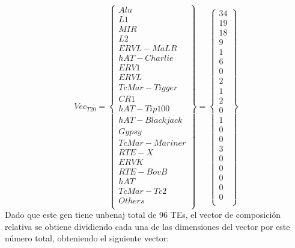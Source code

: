 \documentclass[12pt]{article}
\begin{document}
\begin{equation*}
    Vec_{T20} =
    \begin{Bmatrix}
        Alu\\
        L1\\
        MIR\\
        L2\\
        ERVL-MaLR\\
        hAT-Charlie\\
        ERV1\\
        ERVL\\
        TcMar-Tigger\\
        CR1\\
        hAT-Tip100\\
        hAT-Blackjack\\
        Gypsy\\
        TcMar-Mariner\\
        RTE-X\\
        ERVK\\
        RTE-BovB\\
        hAT\\
        TcMar-Tc2\\
        Others\\
    \end{Bmatrix}
    =
    \begin{Bmatrix}
34\\
19\\
18\\
9\\
1\\
6\\
0\\
2\\
1\\
2\\
0\\
1\\
0\\
0\\
3\\
0\\
0\\
0\\
0\\
0\\
    \end{Bmatrix}
\end{equation*}
Dado que este gen tiene unbenaj total de 96 TEs, el vector de composición relativa se obtiene dividiendo cada una de las dimensiones del vector por este número total, obteniendo el siguiente vector: 
\end{document}

